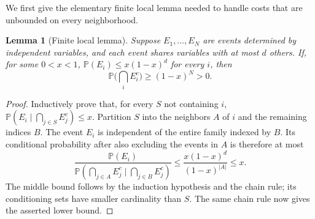 \documentclass[11pt]{article}
\newtheorem{lemma}[theorem]{Lemma}
\numberwithin{equation}{section}
\begin{document}
We first give the elementary finite local lemma needed to handle
costs that are unbounded on every neighborhood.

\begin{lemma}[Finite local lemma]\label{lem:finite-local-lemma}
Suppose $E_1,\ldots,E_N$ are events determined by independent
variables, and each event shares variables with at most $d$ others.
If, for some $0<x<1$,
$\mathbb P(E_i)\le x(1-x)^d$ for every $i$, then
\[
 \mathbb P\Big(\bigcap_i E_i^c\Big)\ge(1-x)^N>0.
\]
\end{lemma}

\begin{proof}
Inductively prove that, for every $S$ not containing $i$,
$\mathbb P(E_i\mid\bigcap_{j\in S}E_j^c)\le x$.
Partition $S$ into the neighbors $A$ of $i$ and the remaining
indices $B$. The event $E_i$ is independent of the entire family
indexed by $B$. Its conditional probability after also excluding
the events in $A$ is therefore at most
\[
 \frac{\mathbb P(E_i)}
 {\mathbb P(\bigcap_{j\in A}E_j^c\mid\bigcap_{j\in B}E_j^c)}
 \le \frac{x(1-x)^d}{(1-x)^{|A|}}\le x.
\]
The middle bound follows by the induction hypothesis and the
chain rule; its conditioning sets have smaller cardinality than
$S$. The same chain rule now gives the asserted lower bound.
\end{proof}
\end{document}
